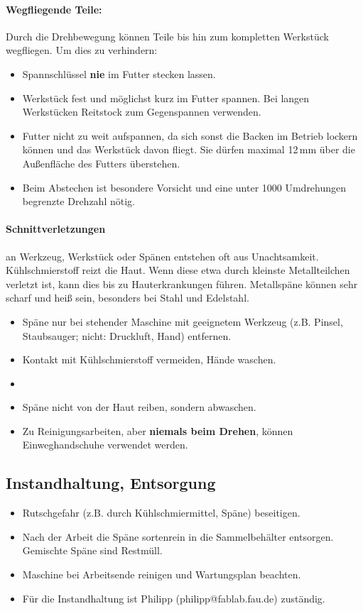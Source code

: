 \documentclass{\basedir/fablab-document}
\begin{document}
\paragraph{Wegfliegende Teile:} Durch die Drehbewegung können Teile bis hin zum kompletten Werkstück wegfliegen. Um dies zu verhindern:
\begin{itemize}
 \item Spannschlüssel \textbf{nie} im Futter stecken lassen.
\item Werkstück fest und möglichst kurz im Futter spannen. Bei langen Werkstücken Reitstock zum Gegenspannen verwenden.
\item Futter nicht zu weit aufspannen, da sich sonst die Backen im Betrieb lockern können und das Werkstück davon fliegt. Sie dürfen maximal 12\,mm über die Außenfläche des Futters überstehen.
\item Beim Abstechen ist besondere Vorsicht und eine unter 1000 Umdrehungen begrenzte Drehzahl nötig.
\end{itemize}

\paragraph{Schnittverletzungen} an Werkzeug, Werkstück oder Spänen entstehen oft aus Unachtsamkeit. Kühlschmierstoff reizt die Haut. Wenn diese etwa durch kleinste Metallteilchen verletzt ist, kann dies bis zu Hauterkrankungen führen. Metallspäne können sehr scharf und heiß sein, besonders bei Stahl und Edelstahl.
\begin{itemize}
\item Späne nur bei stehender Maschine mit geeignetem Werkzeug (z.B. Pinsel, Staubsauger; nicht: Druckluft, Hand) entfernen. %
	\item Kontakt mit Kühlschmierstoff vermeiden, Hände waschen.
	\item {}
	\item Späne nicht von der Haut reiben, sondern abwaschen.
	\item Zu Reinigungsarbeiten, aber \textbf{niemals beim Drehen}, können Einweghandschuhe verwendet werden.
\end{itemize}

\subsection{Instandhaltung, Entsorgung}
\begin{itemize}
\item Rutschgefahr (z.B. durch Kühlschmiermittel, Späne) beseitigen.
\item Nach der Arbeit die Späne sortenrein in die Sammelbehälter entsorgen. Gemischte Späne sind Restmüll.
\item Maschine bei Arbeitsende reinigen und Wartungsplan beachten.
\item Für die Instandhaltung ist Philipp (philipp@fablab.fau.de) zuständig.
\end{itemize}
\end{document}
